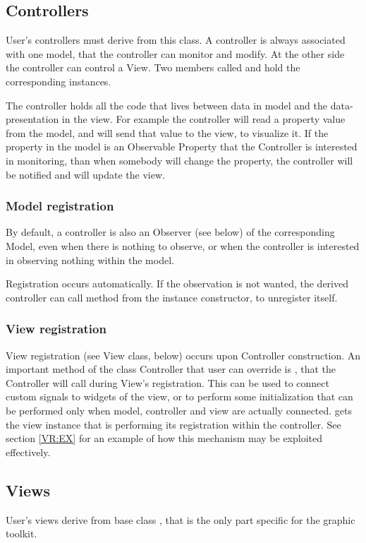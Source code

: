 \subsection{Controllers}
User's controllers must derive from this class.  A controller is
always associated with one model, that the controller can monitor and
modify. At the other side the controller can control a View.  Two
members called  and  hold the
corresponding instances.

The controller holds all the code that lives between data in model and
the data-presentation in the view. For example the controller will
read a property value from the model, and will send that value to the
view, to visualize it.  If the property in the model is an Observable
Property that the Controller is interested in monitoring, than when
somebody will change the property, the controller will be notified and
will update the view.


\subsubsection{Model registration}
By default, a controller is also an Observer (see below) of the
corresponding Model, even when there is nothing to observe, or when
the controller is interested in observing nothing within the model.

Registration occurs automatically. If the observation is not wanted,
the derived controller can call method 
from the instance constructor, to unregister itself.


\subsubsection{\label{VR:D}View registration}
View registration (see View class, below) occurs upon Controller
construction. An important method of the class Controller that user
can override is , that the Controller will
call during View's registration. This can be used to connect custom
signals to widgets of the view, or to perform some initialization
that can be performed only when model, controller and view are
actually connected.   gets the view
instance that is performing its registration within the
controller. See section \ref{VR:EX} for an example of how this
mechanism may be exploited effectively.

\subsection{Views}
User's views derive from base class , that is
the only part specific for the \pygtk graphic toolkit.

